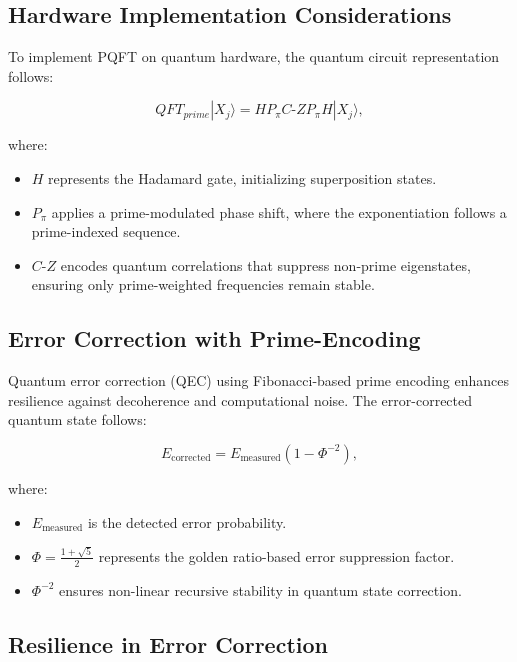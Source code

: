 \documentclass{article}
\theoremstyle{plain}
\begin{document}
\subsection{Hardware Implementation Considerations}

To implement PQFT on quantum hardware, the quantum circuit representation follows:

\begin{equation}
QFT_{prime} |X_j\rangle = H P_{\pi} C\text{-}Z P_{\pi} H |X_j\rangle,
\end{equation}

where:
\begin{itemize}
    \item $H$ represents the Hadamard gate, initializing superposition states.
    \item $P_{\pi}$ applies a prime-modulated phase shift, where the exponentiation follows a prime-indexed sequence.
    \item $C\text{-}Z$ encodes quantum correlations that suppress non-prime eigenstates, ensuring only prime-weighted frequencies remain stable.
\end{itemize}

\subsection{Error Correction with Prime-Encoding}

Quantum error correction (QEC) using Fibonacci-based prime encoding enhances resilience against decoherence and computational noise. The error-corrected quantum state follows:

\begin{equation}
E_{\text{corrected}} = E_{\text{measured}}(1 - \Phi^{-2}),
\end{equation}

where:
\begin{itemize}
    \item $E_{\text{measured}}$ is the detected error probability.
    \item $\Phi = \frac{1+\sqrt{5}}{2}$ represents the golden ratio-based error suppression factor.
    \item $\Phi^{-2}$ ensures non-linear recursive stability in quantum state correction.
\end{itemize}

\subsection{Resilience in Error Correction}
\end{document}
